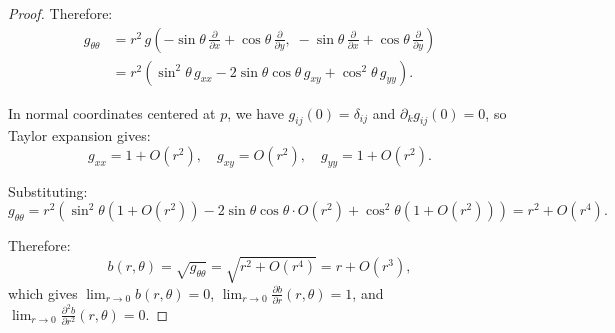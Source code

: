 \begin{proof}
Therefore:
\begin{align*}
g_{\theta\theta} &= r^2 \, g\!\left(-\sin \theta \, \tfrac{\partial}{\partial x} + \cos \theta \, \tfrac{\partial}{\partial y}, \; -\sin \theta \, \tfrac{\partial}{\partial x} + \cos \theta \, \tfrac{\partial}{\partial y}\right) \\
&= r^2 \left(\sin^2 \theta \, g_{xx} - 2 \sin \theta \cos \theta \, g_{xy} + \cos^2 \theta \, g_{yy}\right).
\end{align*}

In normal coordinates centered at $p$, we have $g_{ij}(0) = \delta_{ij}$ and $\partial_k g_{ij}(0) = 0$, so Taylor expansion gives:
\[
g_{xx} = 1 + O(r^2), \quad g_{xy} = O(r^2), \quad g_{yy} = 1 + O(r^2).
\]

Substituting:
\[
g_{\theta\theta} = r^2 \left(\sin^2 \theta (1 + O(r^2)) - 2 \sin \theta \cos \theta \cdot O(r^2) + \cos^2 \theta (1 + O(r^2))\right) = r^2 + O(r^4).
\]

Therefore:
\[
b(r, \theta) = \sqrt{g_{\theta\theta}} = \sqrt{r^2 + O(r^4)} = r + O(r^3),
\]
which gives $\lim_{r \to 0} b(r,\theta) = 0$, $\lim_{r \to 0} \frac{\partial b}{\partial r}(r,\theta) = 1$, and $\lim_{r \to 0} \frac{\partial^2 b}{\partial r^2}(r,\theta) = 0$.
\end{proof}













